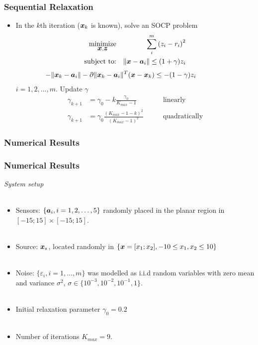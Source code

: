 \documentclass [t] {beamer} %
\begin{document}
\begin{frame} %
\frametitle{Sequential Relaxation}
\begin{itemize}
\item
In the $k$th iteration ($\mbox{\boldmath$x$}_k$ is known), solve %
an SOCP problem
\begin{eqnarray} 
\nonumber
\mathop{\mbox{minimize}}_{\mbox{\boldmath$x$}, \mbox{\boldmath$z$}}& &\sum^m_i \left( z_i - r_i \right)^2 \\
\nonumber
\mbox{subject to:}& &\|\mbox{\boldmath$x$} - \mbox{\boldmath$a$}_i\|  \leq  (1+ \gamma)z_i  
\end{eqnarray}
\begin{equation}
\nonumber
 -\|\mbox{\boldmath$x$}_k - \mbox{\boldmath$a$}_i\| - \partial\|\mbox{\boldmath$x$}_k -\mbox{\boldmath$a$}_i\|^T(\mbox{\boldmath$x$} - \mbox{\boldmath$x$}_k)  \leq  -(1 - \gamma)z_i \qquad \qquad
\end{equation}
$i = 1, 2, ..., m$. 
Update $\gamma$ 
\begin{eqnarray}
\nonumber
\gamma_{k+1} & = \gamma_0 - k\frac{\gamma_0}{K_{max} - 1} \qquad & \mbox{linearly}
\\
\nonumber
 \label{eq:quad}
\gamma_{k+1} & = \gamma_0\frac{(K_{max} - 1 - k)^2}{(K_{max} - 1)^2} \qquad & \mbox{quadratically}
\end{eqnarray} \label{eq:lin}

\end{itemize}
\end{frame}

\subsubsection{Numerical Results}

\begin{frame} %
\frametitle{Numerical Results}
{\large \textit{System setup}}
\\~\\
\begin{itemize}
\item
Sensors: $\{\mbox{\boldmath$a$}_i, i = 1, 2,\ldots,5 \}$ randomly placed in the planar region in $[-15;15]\times[-15;15]$.
\\~\\
\item
Source: $\mbox{\boldmath$x$}_s$, located randomly in  $\{\mbox{\boldmath$x$}=[x_1;x_2], -10\leq x_1,x_2\leq 10\}$
\\~\\
\item
Noise: $\{\varepsilon_i, i=1,\ldots,m\}$ was modelled as i.i.d random variables with zero mean and variance $\sigma^2$,  $\sigma \in \{10^{-3}, 10^{-2}, 10^{-1}, 1\}$.
\\~\\
\item
Initial relaxation parameter $\gamma_0  = 0.2$ 
\\~\\
\item
Number of iterations $K_{max} = 9$.
\end{itemize}
\end{frame}
\end{document}
